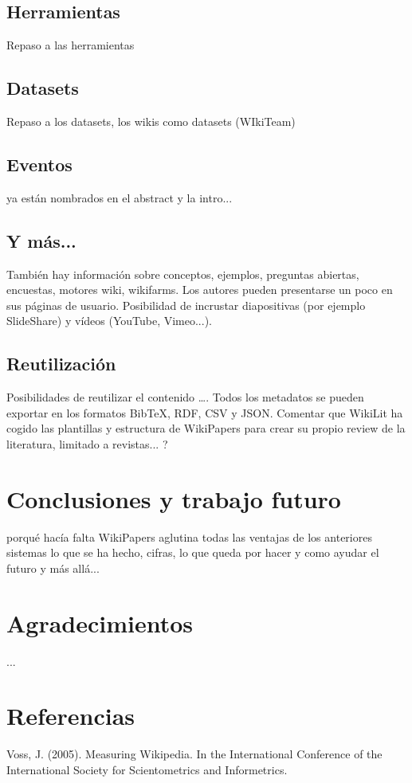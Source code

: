 \documentclass[twoside]{article}
\begin{document}
\begin{multicols}{2}
\subsection{Herramientas}
Repaso a las herramientas

\subsection{Datasets}
Repaso a los datasets, los wikis como datasets (WIkiTeam)

\subsection{Eventos}
ya est\'{a}n nombrados en el abstract y la intro...

\subsection{Y m\'{a}s...}
Tambi\'{e}n hay informaci\'{o}n sobre conceptos, ejemplos, preguntas abiertas, encuestas, motores wiki, wikifarms.
Los autores pueden presentarse un poco en sus p\'{a}ginas de usuario.
Posibilidad de incrustar diapositivas (por ejemplo SlideShare) y v\'{i}deos (YouTube, Vimeo...).

\subsection{Reutilizaci\'{o}n}
Posibilidades de reutilizar el contenido ….
Todos los metadatos se pueden exportar en los formatos BibTeX, RDF, CSV y JSON.
Comentar que WikiLit ha cogido las plantillas y estructura de WikiPapers para crear su propio review de la literatura, limitado a revistas... ?

\section{Conclusiones y trabajo futuro}
porqu\'{e} hac\'{i}a falta WikiPapers
aglutina todas las ventajas de los anteriores sistemas
lo que se ha hecho, cifras,
lo que queda por hacer y como ayudar
el futuro y m\'{a}s all\'{a}...

\section{Agradecimientos}
...

\section{Referencias}
Voss, J. (2005). Measuring Wikipedia. In the International Conference of the International Society for Scientometrics and Informetrics.


\end{multicols}
\end{document}
